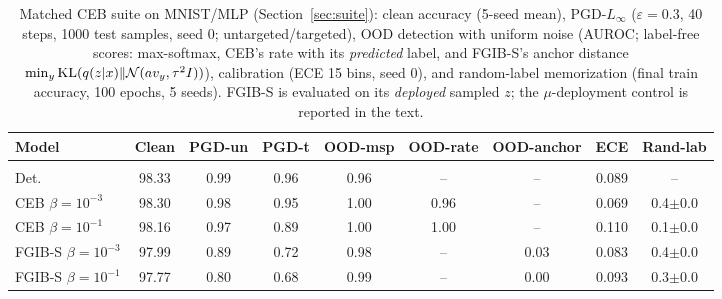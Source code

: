 \begin{table}[t]
\caption{Matched CEB suite on MNIST/MLP (Section~\ref{sec:suite}): clean accuracy (5-seed mean), PGD-$L_\infty$ ($\varepsilon{=}0.3$, 40 steps, 1000 test samples, seed 0; untargeted/targeted), OOD detection with uniform noise (AUROC; label-free scores: max-softmax, CEB's rate with its \emph{predicted} label, and FGIB-S's anchor distance $\min_y\operatorname{KL}(q(z|x)\|\mathcal{N}(a v_y,\tau^2I))$), calibration (ECE 15 bins, seed 0), and random-label memorization (final train accuracy, 100 epochs, 5 seeds). FGIB-S is evaluated on its \emph{deployed} sampled $z$; the $\mu$-deployment control is reported in the text.}
\label{tab:suite}
\begin{center}\footnotesize
\begin{tabular}{lcccccccc}
Model & Clean & PGD-un & PGD-t & OOD-msp & OOD-rate & OOD-anchor & ECE & Rand-lab \\ \hline \\[-1.8ex]
Det. & 98.33 & 0.99 & 0.96 & 0.96 & -- & -- & 0.089 & -- \\
CEB $\beta{=}10^{-3}$ & 98.30 & 0.98 & 0.95 & 1.00 & 0.96 & -- & 0.069 & 0.4$\pm$0.0 \\
CEB $\beta{=}10^{-1}$ & 98.16 & 0.97 & 0.89 & 1.00 & 1.00 & -- & 0.110 & 0.1$\pm$0.0 \\
FGIB-S $\beta{=}10^{-3}$ & 97.99 & 0.89 & 0.72 & 0.98 & -- & 0.03 & 0.083 & 0.4$\pm$0.0 \\
FGIB-S $\beta{=}10^{-1}$ & 97.77 & 0.80 & 0.68 & 0.99 & -- & 0.00 & 0.093 & 0.3$\pm$0.0 \\
\end{tabular}\end{center}\end{table}
